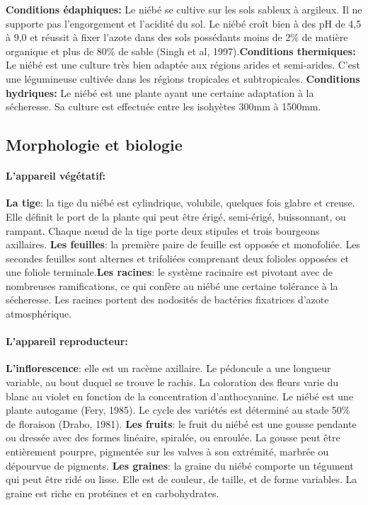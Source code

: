 \documentclass[a4paper,11pt]{article}
\begin{document}
\textbf{Conditions édaphiques:}
Le niébé se cultive sur les sols sableux à argileux. Il ne supporte
pas l’engorgement et l’acidité du sol. Le niébé croît bien à des pH de
4,5 à 9,0 et réussit à fixer l’azote dans des sols possédants moins de
2\% de matière organique et plus de 80\% de sable (Singh et al,
1997)\cite{Doggett_1988}.\textbf{Conditions thermiques:}
Le niébé est une culture très bien adaptée aux régions arides et
semi-arides. C’est une légumineuse cultivée dans les régions
tropicales et subtropicales\cite{Doggett_1988}.
\textbf{Conditions hydriques:} Le niébé est une plante ayant une certaine adaptation à la
sécheresse. Sa culture est effectuée entre les isohyètes 300mm à
1500mm\cite{Doggett_1988}.

\subsection{Morphologie et biologie}

  
\paragraph{L’appareil végétatif:}

\textbf{La tige}: la tige du niébé est cylindrique, volubile, quelques fois
glabre et creuse. Elle définit le port de la plante qui peut être
érigé, semi-érigé, buissonnant, ou rampant. Chaque nœud de la tige
porte deux stipules et trois bourgeons axillaires. \textbf{Les feuilles}: la
première paire de feuille est opposée et monofoliée. Les secondes
feuilles sont alternes et trifoliées comprenant deux folioles opposées
et une foliole terminale.\textbf{Les racines}: le système racinaire est
pivotant avec de nombreuses ramifications, ce qui confère au niébé une
certaine tolérance à la sécheresse. Les racines portent des nodosités
de bactéries fixatrices d’azote atmosphérique\cite{Doggett_1988}.

\paragraph{L’appareil reproducteur:}

\textbf{L’inflorescence}: elle est un racème axillaire. Le pédoncule a une
longueur variable, au bout duquel se trouve le rachis. La coloration
des fleurs varie du blanc au violet en fonction de la concentration
d’anthocyanine. Le niébé est une plante autogame (Fery, 1985). Le cycle des
variétés est déterminé au stade 50\% de floraison (Drabo,
1981). \textbf{Les fruits}: le fruit du niébé est une gousse pendante ou
dressée avec des formes linéaire, spiralée, ou enroulée. La gousse
peut être entièrement pourpre, pigmentée sur les valves à son
extrémité, marbrée ou dépourvue de pigments. \textbf{Les graines}: la graine
du niébé comporte un tégument qui peut être ridé ou lisse. Elle est de
couleur, de taille, et de forme variables. La graine est riche en
protéines et en carbohydrates\cite{Doggett_1988}.
\end{document}
